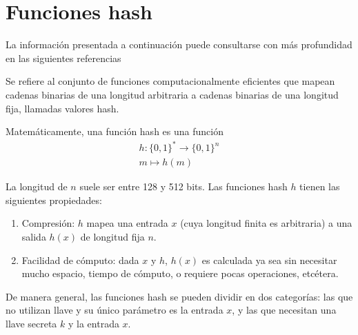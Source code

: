 %
%

\section{Funciones hash}
La información presentada a continuación puede consultarse con más profundidad en las siguientes referencias \cite{hash_hussein, menezes, DBLP:series/isc/DelfsK07}

Se refiere al conjunto de funciones computacionalmente eficientes que
mapean cadenas binarias de una longitud arbitraria a cadenas binarias
de una longitud fija, llamadas valores hash.

Matemáticamente, una función hash es una función
\begin{equation}
  \label{funcion_hash_def}
  \begin{split}
      h: \{0, 1\}^* \longrightarrow \{0,1\}^n \\
      m \longmapsto h(m)
  \end{split}
\end{equation}

La longitud de $n$ suele ser entre 128 y 512 bits. Las funciones hash
$h$ tienen las siguientes propiedades:
\begin{enumerate}
  \item Compresión: $h$ mapea una entrada $x$ (cuya longitud
    finita es arbitraria) a una salida $h(x)$ de longitud fija $n$.
  \item Facilidad de cómputo: dada $x$ y $h$, $h(x)$ es
    calculada ya sea sin necesitar mucho espacio, tiempo de cómputo, o
    requiere pocas operaciones, etcétera.
\end{enumerate}

De manera general, las funciones hash se pueden dividir en dos
categorías: las que no utilizan llave y su único parámetro es la entrada
$x$, y las que necesitan una llave secreta $k$ y la entrada $x$.

